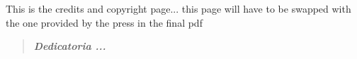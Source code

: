 \newpage


This is the credits and copyright page... this page will have to be swapped with the one provided by the press in the final pdf

\newpage


\vspace*{15mm}
\begin{quotation}
\begin{flushright}
{\bf \em Dedicatoria ...}
\end{flushright}
\end{quotation}

\newpage

\
\newpage



\pagestyle{toc}
\tableofcontents 
\newpage
\pagestyle{regular}
